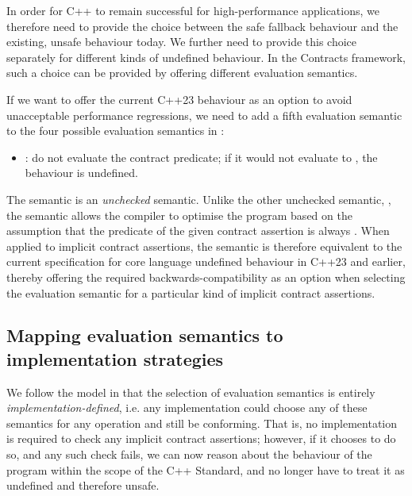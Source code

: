 In order for C++ to remain successful for high-performance applications, we therefore need to provide the choice between the safe fallback behaviour and the existing, unsafe behaviour today. We further need to provide this choice separately for different kinds of undefined behaviour. In the Contracts framework, such a choice can be provided by offering different evaluation semantics.

If we want to offer the current C++23 behaviour as an option to avoid unacceptable performance regressions, we need to add a fifth evaluation semantic to the four possible evaluation semantics in \cite{P2900R7}:
\begin{itemize}
\item {}: do not evaluate the contract predicate; if it would not evaluate to , the behaviour is undefined.
\end{itemize}
The  semantic is an \emph{unchecked} semantic. Unlike the other unchecked semantic, , the  semantic allows the compiler to optimise the program based on the assumption that the predicate of the given contract assertion is always . When applied to implicit contract assertions, the  semantic is therefore equivalent to the current specification for core language undefined behaviour in C++23 and earlier, thereby offering the required backwards-compatibility as an option when selecting the evaluation semantic for a particular kind of implicit contract assertions.

\subsection{Mapping evaluation semantics to implementation strategies}

We follow the model in \cite{P2900R7} that the selection of evaluation semantics is entirely \emph{implementation-defined}, i.e. any implementation could choose any of these semantics for any operation and still be conforming. That is, no implementation is required to check any implicit contract assertions; however, if it chooses to do so, and any such check fails, we can now reason about the behaviour of the program within the scope of the C++ Standard, and no longer have to treat it as undefined and therefore unsafe.


